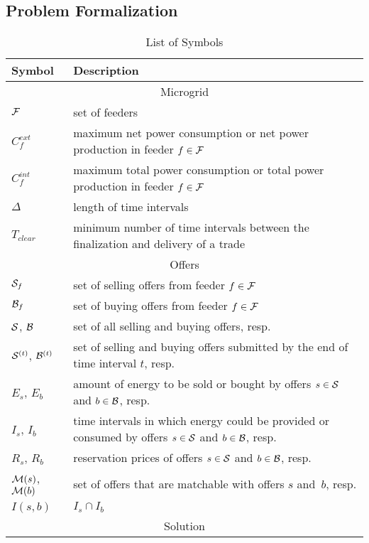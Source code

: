 \subsection{Problem Formalization}

\begin{table}
\caption{List of Symbols}
\centering
\label{tab:symbols}
\renewcommand*{\arraystretch}{1.2}
\begin{tabular}{|l|p{5.8cm}|}
\hline
Symbol & Description \\
\hline
\multicolumn{2}{|c|}{Microgrid} \\
\hline
$\mathcal{F}$ & set of feeders \\
\rowcolor{TableRowGray} $C_f^{ext}$ & maximum net power consumption or net power production in feeder $f \in \mathcal{F}$ \\
$C_f^{int}$ & maximum total power consumption or total power production in feeder $f \in \mathcal{F}$ \\
\rowcolor{TableRowGray} $\Delta$ & length of time intervals \\
$T_{clear}$ & minimum number of time intervals between the finalization and delivery of a trade \\
\hline
\multicolumn{2}{|c|}{Offers} \\
\hline
\rowcolor{TableRowGray} $\mathcal{S}_f$ & set of selling offers from feeder $f \in \mathcal{F}$ \\
$\mathcal{B}_f$ & set of buying offers from feeder $f \in \mathcal{F}$ \\
\rowcolor{TableRowGray} $\mathcal{S}$, $\mathcal{B}$ & set of all selling and buying offers, resp. \\
$\mathcal{S}^{(t)}$, $\mathcal{B}^{(t)}$ & set of selling and buying offers submitted by the end of time interval $t$, resp. \\
\rowcolor{TableRowGray} $E_s$, $E_b$ & amount of energy to be sold or bought by offers $s \in \mathcal{S}$ and $b \in \mathcal{B}$, resp. \\
$I_s$, $I_b$ & time intervals in which energy could be provided or consumed by offers $s \in \mathcal{S}$ and $b \in \mathcal{B}$, resp. \\
\rowcolor{TableRowGray} $R_s$, $R_b$ & reservation prices of offers $s \in \mathcal{S}$ and $b \in \mathcal{B}$, resp. \\
$\mathcal{M}(s)$, $\mathcal{M}(b)$ & set of offers that are matchable with offers $s$ and~$b$, resp. \\
\rowcolor{TableRowGray} $I(s, b)$ & $I_s \cap I_b$ \\
\hline
\multicolumn{2}{|c|}{Solution} \\

\end{tabular}
\end{table}
